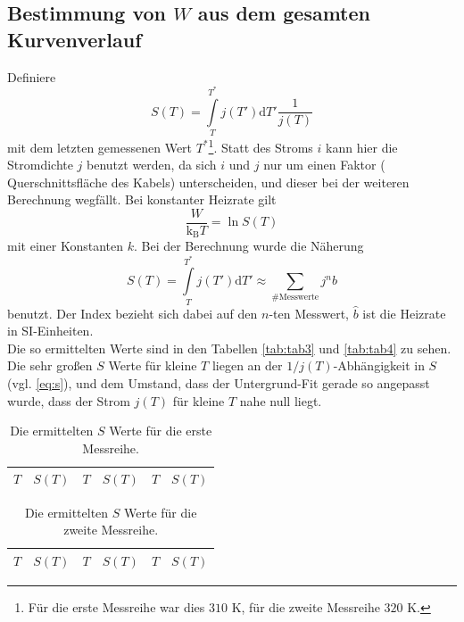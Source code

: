 \subsection{Bestimmung von $W$ aus dem gesamten Kurvenverlauf}
Definiere
\begin{equation}
S(T)=\int\limits_T^{T^*} j(T') \text{d}T' \frac{1}{j(T)} \label{eq:s}
\end{equation}
mit dem letzten gemessenen Wert $T^*$\footnote{Für die erste Messreihe war dies $310$ K, für 
die zweite Messreihe $320$ K.}. Statt des Stroms $i$ kann hier die 
Stromdichte $j$ benutzt werden, da sich $i$ und $j$ nur um einen Faktor (
Querschnittsfläche des Kabels) unterscheiden, und dieser bei der weiteren 
Berechnung wegfällt.
Bei konstanter Heizrate gilt
\begin{equation}
\frac{W}{\text{k}_\text{B} T}=\ln S(T)
\end{equation}
mit einer Konstanten $k$. Bei der Berechnung wurde die Näherung
\begin{equation}
S(T)=\int\limits_T^{T^*} j(T') \text{d}T' \approx \sum\limits_{\#\text{Messwerte}} j^n  \hat{b}
\end{equation}
benutzt. Der Index bezieht sich dabei auf den $n$-ten Messwert, $\hat{b}$ ist die
Heizrate in SI-Einheiten.\\
Die so ermittelten Werte sind in den Tabellen \ref{tab:tab3} und \ref{tab:tab4} zu sehen. Die 
sehr großen $S$ Werte für kleine $T$ liegen an der $1/j(T)$-Abhängigkeit in $S$ (vgl. 
\eqref{eq:s}), 
und dem Umstand, dass der Untergrund-Fit gerade so angepasst wurde, dass der Strom $j(T)$ für 
kleine $T$ nahe null liegt.

\begin{table}
\centering
\begin{tabular}{cccccc}
\toprule
\midrule
$T$ & $S(T)$&$T$ & $S(T)$&$T$ & $S(T)$ \\
\midrule

\midrule
\bottomrule
\end{tabular}
\caption{Die ermittelten $S$ Werte für die erste Messreihe.}
\label{tab:3}
\end{table}

\begin{table}
\centering
\begin{tabular}{cccccc}
\toprule
\midrule
$T$ & $S(T)$&$T$ & $S(T)$&$T$ & $S(T)$ \\
\midrule

\midrule
\bottomrule
\end{tabular}
\caption{Die ermittelten $S$ Werte für die zweite Messreihe.}
\label{tab:4}
\end{table}


